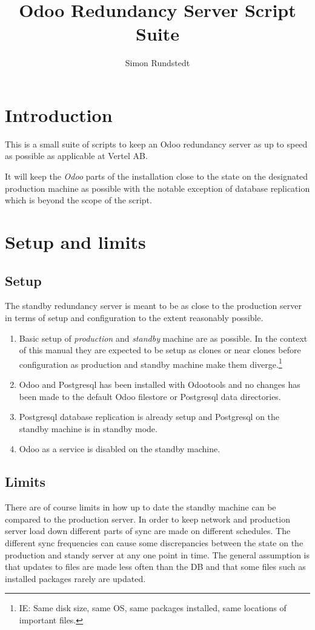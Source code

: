 \documentclass[a4paper]{article}
\title{Odoo Redundancy Server Script Suite}
\author{Simon Rundstedt}
\begin{document}
	\maketitle
	\tableofcontents
	\newpage
	
\section{Introduction}
	This is a small suite of scripts to keep an Odoo redundancy server as up to speed as possible as applicable at Vertel AB.
	
	It will keep the \emph{Odoo} parts of the installation close to the state on the designated production machine as possible with the notable exception of database replication which is beyond the scope of the script.

\section{Setup and limits}
\subsection{Setup}
\label{sec:setup}
	The standby redundancy server is meant to be as close to the production server in terms of setup and configuration to the extent reasonably possible.
	\begin{enumerate}
		\item Basic setup of \emph{production} and \emph{standby} machine are as possible. In the context of this manual they are expected to be setup as clones or near clones before configuration as production and standby machine make them diverge.\footnote{IE: Same disk size, same OS, same packages installed, same locations of important files.}
		\item Odoo and Postgresql has been installed with Odootools and no changes has been made to the default Odoo filestore or Postgresql data directories.
		\item Postgresql database replication is already setup and Postgresql on the standby machine is in standby mode.
		\item Odoo as a service is disabled on the standby machine.
	\end{enumerate}

\subsection{Limits}
	There are of course limits in how up to date the standby machine can be compared to the production server. In order to keep network and production server load down different parts of sync are made on different schedules. The different sync frequencies can cause some discrepancies between the state on the production and standy server at any one point in time.
	The general assumption is that updates to files are made less often than the DB and that some files such as installed packages rarely are updated.	
	
\end{document}
